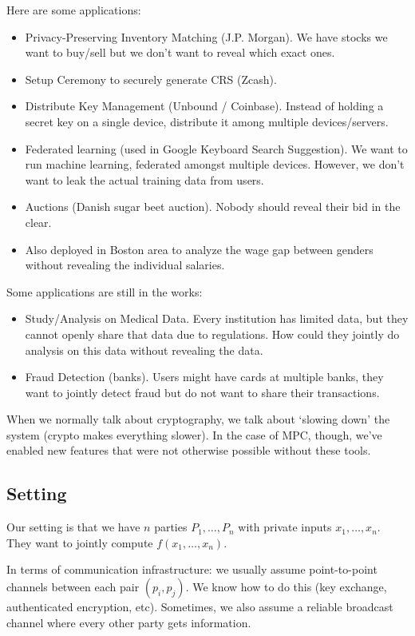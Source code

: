 Here are some applications:
\begin{itemize}
    \item Privacy-Preserving Inventory Matching (J.P. Morgan). We have stocks we want to buy/sell but we don't want to reveal which exact ones.
    \item Setup Ceremony to securely generate CRS (Zcash).
    \item Distribute Key Management (Unbound / Coinbase). Instead of holding a secret key on a single device, distribute it among multiple devices/servers. 
    \item Federated learning (used in Google Keyboard Search Suggestion). We want to run machine learning, federated amongst multiple devices. However, we don't want to leak the actual training data from users.
    \item Auctions (Danish sugar beet auction). Nobody should reveal their bid in the clear.
    \item Also deployed in Boston area to analyze the wage gap between genders without revealing the individual salaries.
\end{itemize}
Some applications are still in the works:
\begin{itemize}
    \item Study/Analysis on Medical Data. Every institution has limited data, but they cannot openly share that data due to regulations. How could they jointly do analysis on this data without revealing the data.
    \item Fraud Detection (banks). Users might have cards at multiple banks, they want to jointly detect fraud but do not want to share their transactions.
\end{itemize}

When we normally talk about cryptography, we talk about `slowing down' the system (crypto makes everything slower). In the case of MPC, though, we've enabled new features that were not otherwise possible without these tools.

\subsection{Setting}
Our setting is that we have $n$ parties $P_1, \dots, P_n$ with private inputs $x_1, \dots, x_n$. They want to jointly compute $f(x_1, \dots, x_n)$.

In terms of communication infrastructure: we usually assume point-to-point channels between each pair $(p_i, p_j)$. We know how to do this (key exchange, authenticated encryption, etc). Sometimes, we also assume a reliable broadcast channel where every other party gets information.

